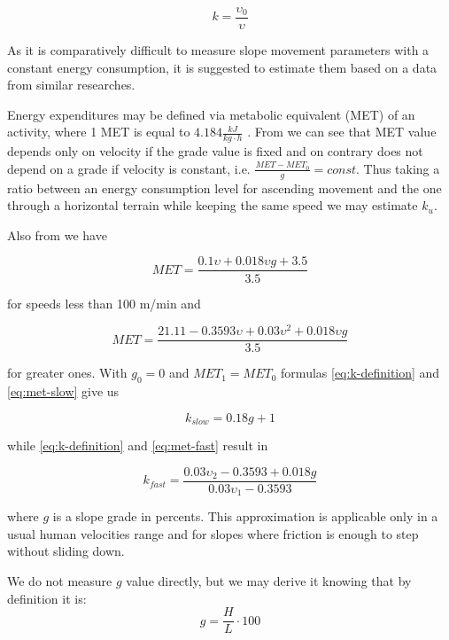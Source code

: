 \documentclass[12pt]{article}
\begin{document}
\begin{equation} \label{eq:k-definition}
k = \frac{\upsilon_{0}}{\upsilon}
\end{equation}

As it is comparatively difficult to measure slope movement parameters with a constant energy consumption, it is suggested to estimate them based on a data from similar researches.

Energy expenditures may be defined via metabolic equivalent (MET) of an activity, where 1 MET is equal to $4.184\frac{kJ}{kg\cdot{h}}$ \cite{wiki-met}. From \cite{acsm-guidelines} we can see that MET value depends only on velocity if the grade value is fixed and on contrary does not depend on a grade if velocity is constant, i.e. $\frac{MET-MET_{0}}{g} = const$. Thus taking a ratio between an energy consumption level for ascending movement and the one through a horizontal terrain while keeping the same speed we may estimate $k_{u}$.

Also from \cite{acsm-guidelines} we have

\begin{equation} \label{eq:met-slow}
MET=\frac{0.1\upsilon+0.018\upsilon g + 3.5}{3.5}
\end{equation}

for speeds less than 100 m/min and

\begin{equation} \label{eq:met-fast}
MET=\frac{21.11 - 0.3593\upsilon + 0.03\upsilon^{2} + 0.018\upsilon g}{3.5}
\end{equation}

for greater ones. With $g_{0} = 0$ and $MET_{1} = MET_{0}$ formulas \ref{eq:k-definition} and \ref{eq:met-slow} give us

\begin{equation} \label{eq:ku-slow}
k_{slow} = 0.18g + 1
\end{equation}

while \ref{eq:k-definition} and \ref{eq:met-fast} result in

\begin{equation} \label{eq:ku-fast}
k_{fast} = \frac{0.03\upsilon_{2}-0.3593 + 0.018g}{0.03\upsilon_{1}-0.3593}
\end{equation}

where $g$ is a slope grade in percents. This approximation is applicable only in a usual human velocities range and for slopes where friction is enough to step without sliding down.

We do not measure $g$ value directly, but we may derive it knowing that by definition it is:
\begin{equation} \label{eq:g-def}
g = \frac{H}{L} \cdot 100
\end{equation}
\end{document}

